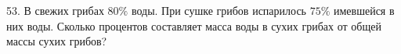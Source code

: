 53. В свежих грибах $80\%$ воды. При сушке грибов испарилось $75\%$ имевшейся в них воды. Сколько процентов составляет масса воды в сухих грибах от общей массы сухих грибов?\\
